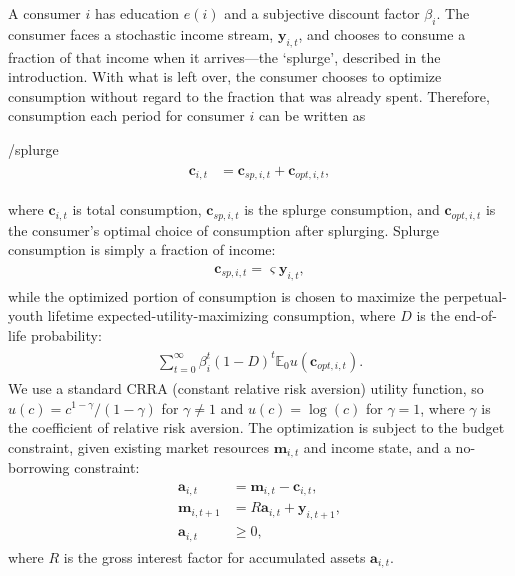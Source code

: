 \documentclass[\econtexRoot/HAFiscal]{subfiles}
\begin{document}
A consumer $i$ has education $e(i)$ and a subjective discount factor $\beta_i$. The consumer faces a stochastic income stream, $\mathbf{y}_{i,t}$, and chooses to consume a fraction of that income when it arrives---the `splurge', described in the introduction. With what is left over, the consumer chooses to optimize consumption without regard to the fraction that was already spent. Therefore, consumption each period for consumer $i$ can be written as
\begin{verbatimwrite}{\EqDir/splurge}
\begin{equation}\begin{gathered}\begin{aligned}
  \mathbf{c}_{i,t} &= \mathbf{c}_{sp,i,t} + \mathbf{c}_{opt,i,t}, \label{eq:model}
\end{aligned}\end{gathered}\end{equation}
\end{verbatimwrite}

where $\mathbf{c}_{i,t}$ is total consumption, $\mathbf{c}_{sp,i,t}$ is the splurge consumption, and $\mathbf{c}_{opt,i,t}$ is the consumer's optimal choice of consumption after splurging.
Splurge consumption is simply a fraction of income:
\begin{equation}\begin{gathered}\begin{aligned}
  \mathbf{c}_{sp,i,t} = \varsigma \mathbf{y}_{i,t},
\end{aligned}\end{gathered}\end{equation}
while the optimized portion of consumption is chosen to maximize the perpetual-youth lifetime expected-utility-maximizing consumption, where $D$ is the end-of-life probability:
\begin{equation}\begin{gathered}\begin{aligned}
  \sum_{t=0}^{\infty}\beta_i^t (1-D)^t \mathbb{E}_0 u(\mathbf{c}_{opt,i,t}).
\end{aligned}\end{gathered}\end{equation}
We use a standard CRRA (constant relative risk aversion) utility function, so $u(c) = c^{1-\gamma}/(1-\gamma)$ for $\gamma \neq 1$ and $u(c) = \log(c)$ for $\gamma=1$, where $\gamma$ is the coefficient of relative risk aversion.
The optimization is subject to the budget constraint, given existing market resources $\mathbf{m}_{i,t}$ and income state, and a no-borrowing constraint: 
\begin{equation}\begin{gathered}\begin{aligned}
  \mathbf{a}_{i,t} &= \mathbf{m}_{i,t} - \mathbf{c}_{i,t}, \\ 
  \mathbf{m}_{i,t+1} &= R \mathbf{a}_{i,t} + \mathbf{y}_{i,t+1}, \\
  \mathbf{a}_{i,t} &\geq 0,  
\end{aligned}\end{gathered}\end{equation}
where $R$ is the gross interest factor for accumulated assets $\mathbf{a}_{i,t}$.
\end{document}
